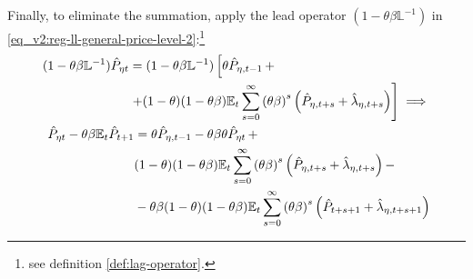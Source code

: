 \documentclass[../thesis.tex]{subfiles}
\begin{document}
Finally, to eliminate the summation, apply the lead operator $(1- \theta \beta \mathbb{L}^{-1})$ in \ref{eq_v2:reg-ll-general-price-level-2}:\footnote{see definition \ref{def:lag-operator}.}
\begin{align}
	\begin{split}
		(1- \theta \beta \mathbb{L}^{-1}) \hat{P}_{\eta t} &= (1- \theta \beta \mathbb{L}^{-1}) \left[ \theta \hat{P}_{\eta, t-1} \, + \right. \\
		&\left. + (1-\theta) (1- \theta \beta) {\mathbb{E}_{t}} \sum_{s=0}^{\infty} \left( \theta \beta \right)^s \left( \hat{P}_{\eta, t+s} + \hat{\lambda}_{\eta, t+s} \right) \right] \implies \nonumber
	\end{split} \\
	\begin{split}
		\hat{P}_{\eta t} - \theta \beta {\mathbb{E}_{t}} \hat{P}_{t+1} &= \theta \hat{P}_{\eta, t-1} - \theta \beta \theta \hat{P}_{\eta t} \, + \\
		& (1-\theta) (1- \theta \beta) {\mathbb{E}_{t}} \sum_{s=0}^{\infty} \left( \theta \beta \right)^s \left( \hat{P}_{\eta, t+s} + \hat{\lambda}_{\eta, t+s} \right) - \\
		& - \theta \beta (1-\theta) (1- \theta \beta) {\mathbb{E}_{t}} \sum_{s=0}^{\infty} \left( \theta \beta \right)^s \left( \hat{P}_{t+s+1} + \hat{\lambda}_{\eta, t+s+1} \right)
	\end{split} \label{eq_v2:reg-ll-general-price-level-3}
\end{align}
\end{document}
